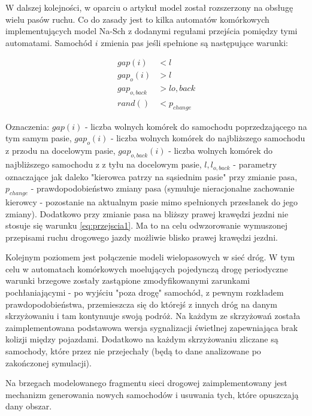 \documentclass[a4paper,12pt]{article}
\begin{document}
W dalszej kolejności, w oparciu o artykuł \cite{nagel1995twolane} model został rozszerzony na obsługę wielu pasów ruchu. Co do zasady jest to kilka automatów komórkowych implementujących model Na-Sch z dodanymi regułami przejścia pomiędzy tymi automatami. Samochód $i$ zmienia pas jeśli spełnione są następujące warunki:

\begin{subequations}
\label{eq:przejscia}
\begin{align}
gap(i) &< l \label{eq:przejscia1} \\
gap_{o}(i) &> l \label{eq:przejscia2} \\
gap_{o, back} &> l{o, back} \label{eq:przejscia3} \\
rand() &< p_{change} \label{eq:przejscia4}
\end{align}
\end{subequations}

Oznaczenia: $gap(i)$ - liczba wolnych komórek do samochodu poprzedzającego na tym samym pasie, $gap_{o}(i)$ - liczba wolnych komórek do najbliższego samochodu z przodu na docelowym pasie, $gap_{o,back}(i)$ - liczba wolnych komórek do najbliższego samochodu z z tyłu na docelowym pasie, $l, l_{o,back}$ - parametry oznaczające jak daleko "kierowca patrzy na sąsiednim pasie" przy zmianie pasa, $p_{change}$ - prawdopodobieństwo zmiany pasa (symuluje nieracjonalne zachowanie kierowcy - pozostanie na aktualnym pasie mimo spełnionych przesłanek do jego zmiany). Dodatkowo przy zmianie pasa na bliższy prawej krawędzi jezdni nie stosuje się warunku \ref{eq:przejscia1}. Ma to na celu odwzorowanie wymuszonej przepisami ruchu drogowego jazdy możliwie blisko prawej krawędzi jezdni.

Kolejnym poziomem jest połączenie modeli wielopasowych w sieć dróg. W tym celu w automatach komórkowych moelujących pojedynczą drogę periodyczne warunki brzegowe zostały zastąpione zmodyfikowanymi zarunkami pochłaniającymi - po wyjściu "poza drogę" samochód, z pewnym rozkładem prawdopodobieństwa, przemieszcza się do którejś z innych dróg na danym skrzyżowaniu i tam kontynuuje swoją podróż. Na każdym ze skrzyżowań została zaimplementowana podstawowa wersja sygnalizacji świetlnej zapewniająca brak kolizji między pojazdami. Dodatkowo na każdym skrzyżowaniu zliczane są samochody, które przez nie przejechały (będą to dane analizowane po zakończonej symulacji).

Na brzegach modelowanego fragmentu sieci drogowej zaimplementowany jest mechanizm generowania nowych samochodów i usuwania tych, które opuszczają dany obszar.
\end{document}
